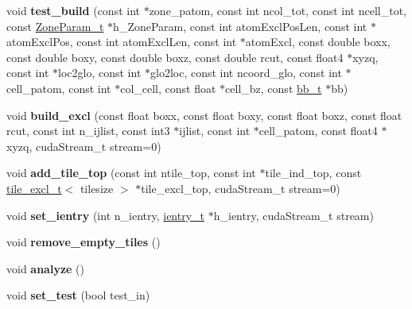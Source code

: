\begin{DoxyCompactItemize}
void {\bfseries test\+\_\+build} (const int $\ast$zone\+\_\+patom, const int ncol\+\_\+tot, const int ncell\+\_\+tot, const \hyperlink{structZoneParam__t}{Zone\+Param\+\_\+t} $\ast$h\+\_\+\+Zone\+Param, const int atom\+Excl\+Pos\+Len, const int $\ast$atom\+Excl\+Pos, const int atom\+Excl\+Len, const int $\ast$atom\+Excl, const double boxx, const double boxy, const double boxz, const double rcut, const float4 $\ast$xyzq, const int $\ast$loc2glo, const int $\ast$glo2loc, const int ncoord\+\_\+glo, const int $\ast$cell\+\_\+patom, const int $\ast$col\+\_\+cell, const float $\ast$cell\+\_\+bz, const \hyperlink{structbb__t}{bb\+\_\+t} $\ast$bb)
\item 
\hypertarget{classCudaNeighborListBuild_ab4f99c809fe21ba1d978f28b0773aa19}{}\label{classCudaNeighborListBuild_ab4f99c809fe21ba1d978f28b0773aa19} 
void {\bfseries build\+\_\+excl} (const float boxx, const float boxy, const float boxz, const float rcut, const int n\+\_\+ijlist, const int3 $\ast$ijlist, const int $\ast$cell\+\_\+patom, const float4 $\ast$xyzq, cuda\+Stream\+\_\+t stream=0)
\item 
\hypertarget{classCudaNeighborListBuild_a77dfc36f257bc6fe50a3ad4c026ac96b}{}\label{classCudaNeighborListBuild_a77dfc36f257bc6fe50a3ad4c026ac96b} 
void {\bfseries add\+\_\+tile\+\_\+top} (const int ntile\+\_\+top, const int $\ast$tile\+\_\+ind\+\_\+top, const \hyperlink{structtile__excl__t}{tile\+\_\+excl\+\_\+t}$<$ tilesize $>$ $\ast$tile\+\_\+excl\+\_\+top, cuda\+Stream\+\_\+t stream=0)
\item 
\hypertarget{classCudaNeighborListBuild_a380a0d65aabb186f9e0b86c67eb18acc}{}\label{classCudaNeighborListBuild_a380a0d65aabb186f9e0b86c67eb18acc} 
void {\bfseries set\+\_\+ientry} (int n\+\_\+ientry, \hyperlink{structientry__t}{ientry\+\_\+t} $\ast$h\+\_\+ientry, cuda\+Stream\+\_\+t stream)
\item 
\hypertarget{classCudaNeighborListBuild_a5ce4bca5691c0814a14a2f6912432555}{}\label{classCudaNeighborListBuild_a5ce4bca5691c0814a14a2f6912432555} 
void {\bfseries remove\+\_\+empty\+\_\+tiles} ()
\item 
\hypertarget{classCudaNeighborListBuild_af0d7778aba625825d70fd97c90c2e87f}{}\label{classCudaNeighborListBuild_af0d7778aba625825d70fd97c90c2e87f} 
void {\bfseries analyze} ()
\item 
\hypertarget{classCudaNeighborListBuild_ae7aa8dcc77c35d61cbb56dec89790cf8}{}\label{classCudaNeighborListBuild_ae7aa8dcc77c35d61cbb56dec89790cf8} 
void {\bfseries set\+\_\+test} (bool test\+\_\+in)
\item 

\end{DoxyCompactItemize}
